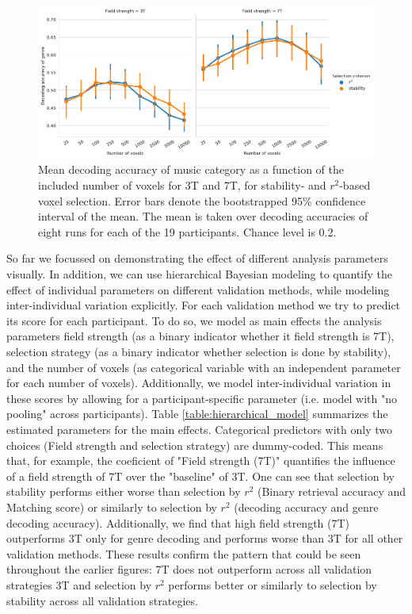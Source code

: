 \begin{figure}[H]
  \centering
  \includegraphics[width=\linewidth]{pics/decoding_genre_selection.pdf}

  \caption{Mean decoding accuracy of music category as a function of
  the included number of voxels for 3T and 7T, for stability- and
  $r^2$-based voxel selection. Error bars denote the bootstrapped 95\%
  confidence interval of the mean. The mean is taken over decoding
  accuracies of eight runs for each of the 19 participants. Chance level is 0.2.}

 \label{fig:decoding_accuracy_selection}
\end{figure}

So far we focussed on demonstrating the effect of different analysis parameters visually.
In addition, we can use hierarchical Bayesian modeling \citep{gelman2013bayesian} to quantify the effect of individual parameters on different validation methods, while modeling inter-individual variation explicitly.
For each validation method we try to predict its score for each participant.
To do so, we model as main effects the analysis parameters field strength (as a binary indicator whether it field strength is 7T), selection strategy (as a binary indicator whether selection is done by stability), and the number of voxels (as categorical variable with an independent parameter for each number of voxels).
Additionally, we model inter-individual variation in these scores by allowing for a participant-specific parameter (i.e. model with "no pooling" across participants).
Table \ref{table:hierarchical_model} summarizes the estimated parameters for the main effects.
Categorical predictors with only two choices (Field strength and selection strategy) are dummy-coded.
This means that, for example, the coeficient of "Field strength (7T)" quantifies the influence of a field strength of 7T over the "baseline" of 3T.
One can see that selection by stability performs either worse than selection by $r^{2}$ (Binary retrieval accuracy and Matching score) or similarly to selection by $r^{2}$ (decoding accuracy and genre decoding accuracy).
Additionally, we find that high field strength (7T) outperforms 3T only for genre decoding and performs worse than 3T for all other validation methods.
These results confirm the pattern that could be seen throughout the earlier figures: 7T does not outperform across all validation strategies 3T and selection by $r^{2}$ performs better or similarly to selection by stability across all validation strategies.

